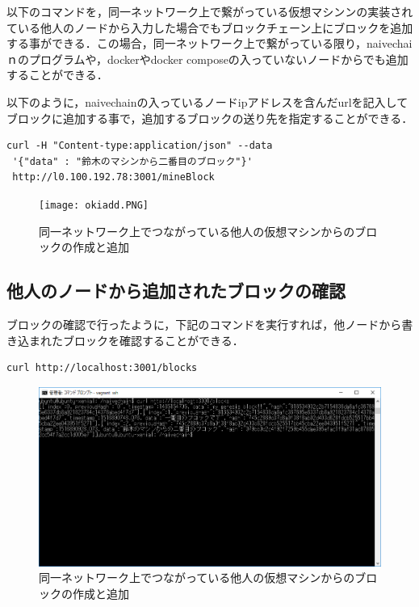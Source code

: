 以下のコマンドを，同一ネットワーク上で繋がっている仮想マシンンの実装されている他人のノードから入力した場合でもブロックチェーン上にブロックを追加する事ができる．この場合，同一ネットワーク上で繋がっている限り，naivechaiｎのプログラムや，dockerやdocker composeの入っていないノードからでも追加することができる．


以下のように，naivechainの入っているノードipアドレスを含んだurlを記入してブロックに追加する事で，追加するブロックの送り先を指定することができる．


\begin{verbatim}
curl -H "Content-type:application/json" --data
 '{"data" : "鈴木のマシンから二番目のブロック"}'
 http://l0.100.192.78:3001/mineBlock
\end{verbatim}



\begin{figure}[h]
\centering
\texttt{[image: okiadd.PNG]}
\caption{同一ネットワーク上でつながっている他人の仮想マシンからのブロックの作成と追加}\label{サンプル図}
\end{figure}


\newpage


\subsection{他人のノードから追加されたブロックの確認}

ブロックの確認で行ったように，下記のコマンドを実行すれば，他ノードから書き込まれたブロックを確認することができる．
\begin{verbatim}
curl http://localhost:3001/blocks
\end{verbatim}

\begin{figure}[h]
\centering
\includegraphics[width=12cm]{no2blockok.PNG}
\caption{同一ネットワーク上でつながっている他人の仮想マシンからのブロックの作成と追加}\label{サンプル図}
\end{figure}


